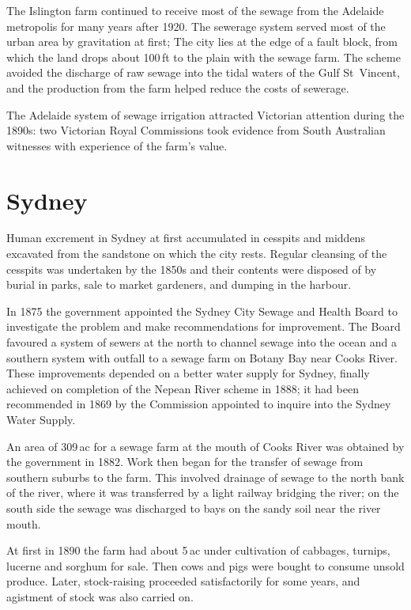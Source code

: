The Islington farm continued to receive most of the sewage from the
Adelaide metropolis for many years after 1920.  The sewerage system
served most of the urban area by gravitation at first; The city lies
at the edge of a fault block, from which the land drops about 100\,ft
to the plain with the sewage farm.  The scheme avoided the discharge
of raw sewage into the tidal waters of the Gulf St~Vincent, and the
production from the farm helped reduce the costs of sewerage.

The Adelaide system of sewage irrigation attracted Victorian attention
during the 1890s: two Victorian Royal Commissions took evidence from
South Australian witnesses with experience of the farm's
value.

\section*{Sydney}

Human excrement in Sydney at first accumulated in cesspits and middens
excavated from the sandstone on which the city rests.  Regular
cleansing of the cesspits was undertaken by the 1850s and their
contents were disposed of by burial in parks, sale to market
gardeners, and dumping in the harbour.

In 1875 the government appointed the Sydney City Sewage and Health
Board to investigate the problem and make recommendations for
improvement.  The Board favoured a system of sewers at the north to
channel sewage into the ocean and a southern system with outfall to a
sewage farm on Botany Bay near Cooks River.  These improvements
depended on a better water supply for Sydney, finally achieved on
completion of the Nepean River scheme in 1888; it had been recommended
in 1869 by the Commission appointed to inquire into the Sydney Water
Supply.

An area of 309\,ac for a sewage farm at the mouth of Cooks River was
obtained by the government in 1882.  Work then began for the transfer
of sewage from southern suburbs to the farm.  This involved drainage
of sewage to the north bank of the river, where it was transferred by
a light railway bridging the river; on the south side the sewage was
discharged to bays on the sandy soil near the river mouth.

At first in 1890 the farm had about 5\,ac under cultivation of
cabbages, tur\-nips, lucerne and sorghum for sale.  Then cows and pigs
were bought to consume unsold produce.  Later, stock-raising proceeded
satisfactorily for some years, and agistment of stock was also carried
on.

